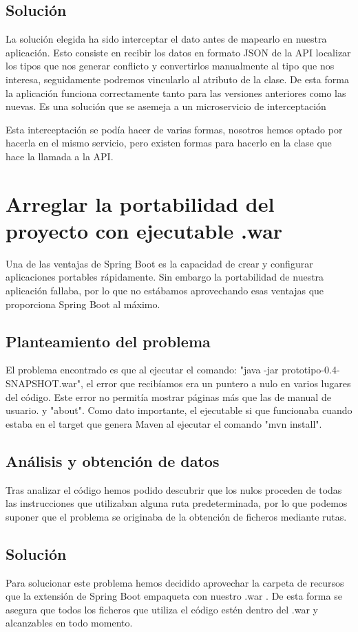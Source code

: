 \subsection{Solución}
La solución elegida ha sido interceptar el dato antes de mapearlo en nuestra aplicación. Esto consiste en recibir los datos en formato JSON de la API localizar los tipos que nos generar conflicto y convertirlos manualmente al tipo que nos interesa, seguidamente podremos vincularlo al atributo de la clase. De esta forma la aplicación funciona correctamente tanto para las versiones anteriores como las nuevas. Es una solución que se asemeja a un microservicio de interceptación \cite{interceptor}

Esta interceptación se podía hacer de varias formas, nosotros hemos optado por hacerla en el mismo servicio, pero existen formas para hacerlo en la clase que hace la llamada a la API\cite{spring-interceptor}.

\section{Arreglar la portabilidad del proyecto con ejecutable .war}
Una de las ventajas de Spring Boot es la capacidad de crear y configurar aplicaciones portables rápidamente. Sin embargo la portabilidad de nuestra aplicación fallaba, por lo que no estábamos aprovechando esas ventajas que proporciona Spring Boot al máximo. 
\subsection{Planteamiento del problema}
El problema encontrado es que al ejecutar el comando: 
"java -jar prototipo-0.4-SNAPSHOT.war", el error que recibíamos era un puntero a nulo en varios lugares del código. Este error no permitía mostrar páginas más que las de manual de usuario. y "about". Como dato importante, el ejecutable si que funcionaba cuando estaba en el target que genera Maven al ejecutar el comando "mvn install".
\subsection{Análisis y obtención de datos}
Tras analizar el código hemos podido descubrir que los nulos proceden de todas las instrucciones que utilizaban alguna ruta predeterminada, por lo que podemos suponer que el problema se originaba de la obtención de ficheros mediante rutas. 

\subsection{Solución}
Para solucionar este problema hemos decidido aprovechar la carpeta de recursos que la extensión de Spring Boot empaqueta con nuestro .war \cite{read-file-from-resources}. De esta forma se asegura que todos los ficheros que utiliza el código estén dentro del .war y alcanzables en todo momento.

